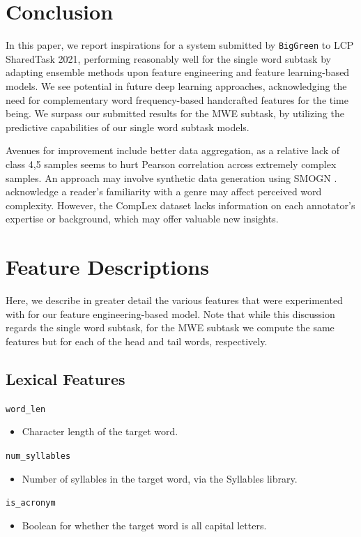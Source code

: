 \documentclass[11pt,a4paper]{article}
\begin{document}
\section{Conclusion}

In this paper, we report inspirations for a system submitted by \texttt{BigGreen} to LCP SharedTask 2021, performing reasonably well for the single word subtask by adapting ensemble methods upon feature engineering and feature learning-based models. We see potential in future deep learning approaches, acknowledging the need for complementary word frequency-based handcrafted features for the time being. We surpass our submitted results for the MWE subtask, by utilizing the predictive capabilities of our single word subtask models.

Avenues for improvement include better data aggregation, as a relative lack of class 4,5 samples seems to hurt Pearson correlation across extremely complex samples. An approach may involve synthetic data generation using SMOGN \citep{branco2017smogn}. \citet{shardlow2020complex} acknowledge a reader's familiarity with a genre may affect perceived word complexity. However, the CompLex dataset lacks information on each annotator's expertise or background, which may offer valuable new insights.



\clearpage
\appendix

\section{Feature Descriptions}
\label{appendix:descriptions}

Here, we describe in greater detail the various features that were experimented with for our feature engineering-based model. Note that while this discussion regards the single word subtask, for the MWE subtask we compute the same features but for each of the head and tail words, respectively.

\subsection{Lexical Features}

\texttt{word\_len}
\begin{itemize}
  \item Character length of the target word.
\end{itemize}
\texttt{num\_syllables}
\begin{itemize}
  \item Number of syllables in the target word, via the Syllables library.
\end{itemize}
\texttt{is\_acronym}
\begin{itemize}
  \item Boolean for whether the target word is all capital letters.
\end{itemize}
\end{document}
